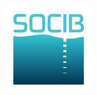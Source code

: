 \begin{titlepage}
\begin{center}
\hspace{+0.6cm}\includegraphics[scale=0.25]{fig/socib.jpg}\\
\end{center}
\end{titlepage}


